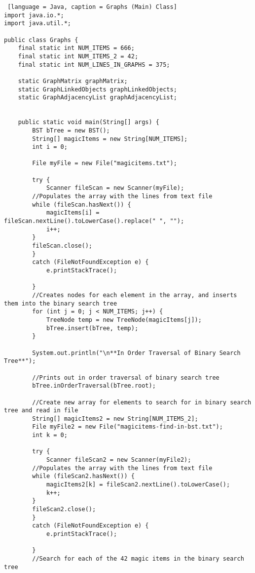 \documentclass{article}
\begin{document}
\begin{lstlisting} [language = Java, caption = Graphs (Main) Class]
import java.io.*;
import java.util.*;

public class Graphs {
    final static int NUM_ITEMS = 666;
    final static int NUM_ITEMS_2 = 42;
    final static int NUM_LINES_IN_GRAPHS = 375;

    static GraphMatrix graphMatrix;
    static GraphLinkedObjects graphLinkedObjects;
    static GraphAdjacencyList graphAdjacencyList;


    public static void main(String[] args) {
        BST bTree = new BST();
        String[] magicItems = new String[NUM_ITEMS];
        int i = 0;

        File myFile = new File("magicitems.txt");

        try {
            Scanner fileScan = new Scanner(myFile);
        //Populates the array with the lines from text file
        while (fileScan.hasNext()) {
            magicItems[i] = fileScan.nextLine().toLowerCase().replace(" ", "");
            i++;
        }
        fileScan.close();            
        }
        catch (FileNotFoundException e) {
            e.printStackTrace();

        }
        //Creates nodes for each element in the array, and inserts them into the binary search tree
        for (int j = 0; j < NUM_ITEMS; j++) {
            TreeNode temp = new TreeNode(magicItems[j]);
            bTree.insert(bTree, temp);
        }

        System.out.println("\n**In Order Traversal of Binary Search Tree**");

        //Prints out in order traversal of binary search tree
        bTree.inOrderTraversal(bTree.root);
        
        //Create new array for elements to search for in binary search tree and read in file
        String[] magicItems2 = new String[NUM_ITEMS_2];
        File myFile2 = new File("magicitems-find-in-bst.txt");
        int k = 0;

        try {
            Scanner fileScan2 = new Scanner(myFile2);
        //Populates the array with the lines from text file
        while (fileScan2.hasNext()) {
            magicItems2[k] = fileScan2.nextLine().toLowerCase();
            k++;
        }
        fileScan2.close();            
        }
        catch (FileNotFoundException e) {
            e.printStackTrace();

        }
        //Search for each of the 42 magic items in the binary search tree
        

\end{lstlisting}
\end{document}

